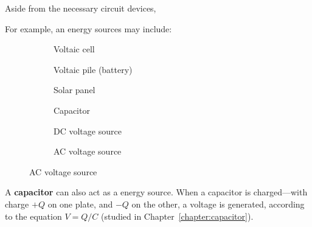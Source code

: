 Aside from the necessary circuit devices,

For example, an energy sources may include:
\begin{figure}[ht]
  \centering
  \begin{subfigure}{.32\textwidth}
    \centering
    \caption{Voltaic cell}
  \end{subfigure}
  \begin{subfigure}{.32\textwidth}
    \centering
    \caption{Voltaic pile (battery)}
  \end{subfigure}
  \begin{subfigure}{.32\textwidth}
    \centering
    \caption{Solar panel}
  \end{subfigure}

  \begin{subfigure}{.32\textwidth}
    \centering
    \caption{Capacitor}
  \end{subfigure}
  \begin{subfigure}{.32\textwidth}
    \centering
    \caption{DC voltage source}
  \end{subfigure}
  \begin{subfigure}{.32\textwidth}
    \centering
    \caption{AC voltage source}
  \end{subfigure}
\end{figure}

A \textbf{capacitor} can also act as a energy source. When a capacitor is
charged---with charge $+Q$ on one plate, and $-Q$ on the other, a voltage is
generated, according to the equation $V=Q/C$ (studied in
Chapter~\ref{chapter:capacitor}).

